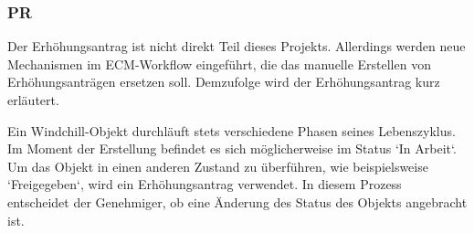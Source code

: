 \subsubsection{\acl{PR}}
Der Erhöhungsantrag ist nicht direkt Teil dieses Projekts.
Allerdings werden neue Mechanismen im \ac{ECM}-Workflow eingeführt, die das manuelle Erstellen von Erhöhungsanträgen ersetzen soll.
Demzufolge wird der Erhöhungsantrag kurz erläutert.

Ein Windchill-Objekt durchläuft stets verschiedene Phasen seines Lebenszyklus.
Im Moment der Erstellung befindet es sich möglicherweise im Status `In Arbeit`.
Um das Objekt in einen anderen Zustand zu überführen, wie beispielsweise `Freigegeben`, wird ein Erhöhungsantrag verwendet.
In diesem Prozess entscheidet der Genehmiger, ob eine Änderung des Status des Objekts angebracht ist.